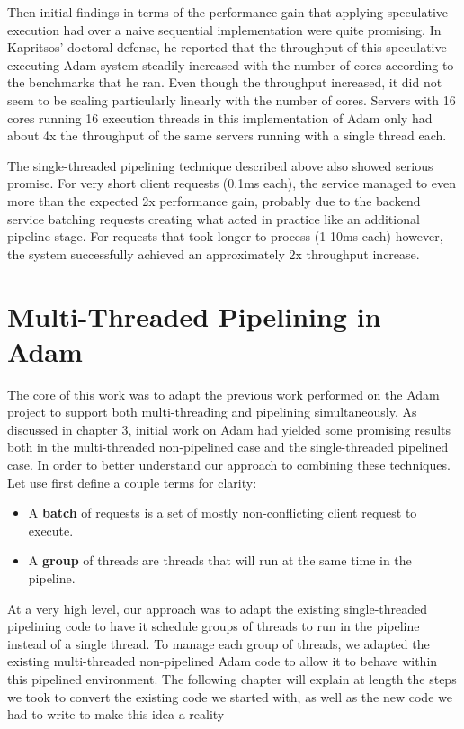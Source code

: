 \documentclass[11pt, oneside]{report}
\begin{document}
Then initial findings in terms of the performance gain that applying speculative execution had over a naive sequential implementation were quite promising. In Kapritsos' doctoral defense, he reported that the throughput of this speculative executing Adam system steadily increased with the number of cores according to the benchmarks that he ran. Even though the throughput increased, it did not seem to be scaling particularly linearly with the number of cores. Servers with 16 cores running 16 execution threads in this implementation of Adam only had about 4x the throughput of the same servers running with a single thread each.

The single-threaded pipelining technique described above also showed serious promise. For very short client requests (0.1ms each), the service managed to even more than the expected 2x performance gain, probably due to the backend service batching requests creating what acted in practice like an additional pipeline stage. For requests that took longer to process (1-10ms each) however, the system successfully achieved an approximately 2x throughput increase.


\chapter{Multi-Threaded Pipelining in Adam}

The core of this work was to adapt the previous work performed on the Adam project to support both multi-threading and pipelining simultaneously. As discussed in chapter 3, initial work on Adam had yielded some promising results both in the multi-threaded non-pipelined case and the single-threaded pipelined case. In order to better understand our approach to combining these techniques. Let use first define a couple terms for clarity:
\begin{itemize}
\item A \textbf{batch} of requests is a set of mostly non-conflicting client request to execute.
\item A \textbf{group} of threads are threads that will run at the same time in the pipeline.
\end{itemize}

At a very high level, our approach was to adapt the existing single-threaded pipelining code to have it schedule groups of threads to run in the pipeline instead of a single thread. To manage each group of threads, we adapted the existing multi-threaded non-pipelined Adam code to allow it to behave within this pipelined environment. The following chapter will explain at length the steps we took to convert the existing code we started with, as well as the new code we had to write to make this idea a reality
\end{document}
